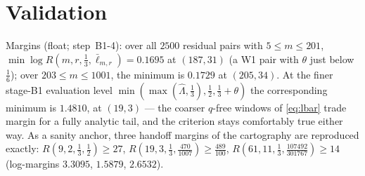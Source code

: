 \documentclass[11pt]{amsart}
\theoremstyle{remark}
\newcommand{\lbar}{\bar\ell}
\newcommand{\Lhat}{\widehat\Lambda}
\begin{document}
\section{Validation}\label{sec:valid}

Margins (float; step~B1-4): over all $2500$ residual pairs with $5\le m\le201$, $\min\log R(m,r,\tfrac13,\lbar_{m,r})=0.1695$ at $(187,31)$ (a W1 pair with $\theta$ just below $\tfrac16$); over $203\le m\le1001$, the minimum is $0.1729$ at $(205,34)$.  At the finer stage-B1 evaluation level $\min(\max(\Lhat,\tfrac13),\tfrac12,\tfrac13+\theta)$ the corresponding minimum is $1.4810$, at $(19,3)$ --- the coarser $q$-free windows of \eqref{eq:lbar} trade margin for a fully analytic tail, and the criterion stays comfortably true either way.  As a sanity anchor, three handoff margins of the cartography are reproduced exactly: $R(9,2,\tfrac13,\tfrac12)\ge27$, $R(19,3,\tfrac13,\tfrac{470}{1007})\ge\tfrac{489}{100}$, $R(61,11,\tfrac13,\tfrac{107492}{301767})\ge14$ (log-margins $3.3095$, $1.5879$, $2.6532$).
\end{document}
